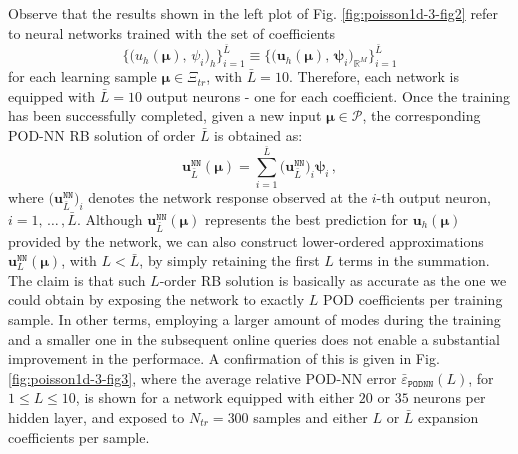 \documentclass[12pt, a4paper, twoside, openright, notitlepage]{report}
\numberwithin{equation}{chapter}
\theoremstyle{theorem}
\theoremstyle{definition}
\theoremstyle{remark}
\theoremstyle{proposition}
\numberwithin{figure}{chapter}
\newcommand{\bg}[1]{\boldsymbol{#1}}
\begin{document}
		Observe that the results shown in the left plot of Fig. \ref{fig:poisson1d-3-fig2} refer to neural networks trained with the set of coefficients \[ \big\lbrace \big( u_h(\bg{\mu}), \, \psi_i \big)_h \big\rbrace_{i = 1}^{\scriptscriptstyle{\bar{L}}} \equiv \big\lbrace \big( \mathbf{u}_h(\bg{\mu}), \, \bg{\psi}_i \big)_{\mathbb{R}^M} \big\rbrace_{i = 1}^{\scriptscriptstyle{\bar{L}}} \] for each learning sample $\bg{\mu} \in \Xi_{tr}$, with $\bar{L} = 10$. Therefore, each network is equipped with $\bar{L} = 10$ output neurons - one for each coefficient. Once the training has been successfully completed, given a new input $\bg{\mu} \in \mathcal{P}$, the corresponding POD-NN RB solution of order $\bar{L}$ is obtained as:
		\begin{equation}
			\label{eq:podnn-solution-full}
			\mathbf{u}_{\bar{L}}^{\texttt{NN}}(\bg{\mu}) = \sum_{i = 1}^{\bar{L}} \big( \mathbf{u}_{\bar{L}}^{\texttt{NN}} \big)_i \bg{\psi}_i \, ,
		\end{equation} 
		where $\big( \mathbf{u}_{\bar{L}}^{\texttt{NN}} \big)_i$ denotes the network response observed at the $i$-th output neuron, $i = 1, \, \ldots \, , \bar{L}$. Although $\mathbf{u}_{\bar{L}}^{\texttt{NN}}(\bg{\mu})$ represents the best prediction for $\mathbf{u}_h(\bg{\mu})$ provided by the network, we can also construct lower-ordered approximations $\mathbf{u}_L^{\texttt{NN}}(\bg{\mu})$, with $L < \bar{L}$, by simply retaining the first $L$ terms in the summation. The claim is that such $L$-order RB solution is basically as accurate as the one we could obtain by exposing the network to exactly $L$ POD coefficients per training sample. In other terms, employing a larger amount of modes during the training and a smaller one in the subsequent online queries does not enable a substantial improvement in the performace. A confirmation of this is given in Fig. \ref{fig:poisson1d-3-fig3}, where the average relative POD-NN error $\bar{\varepsilon}_{\texttt{PODNN}}^{}(L)$, for $1 \leq L \leq 10$, is shown for a network equipped with either $20$ or $35$ neurons per hidden layer, and exposed to $N_{tr} = 300$ samples and either $L$ or $\bar{L}$ expansion coefficients per sample.
		
\end{document}
